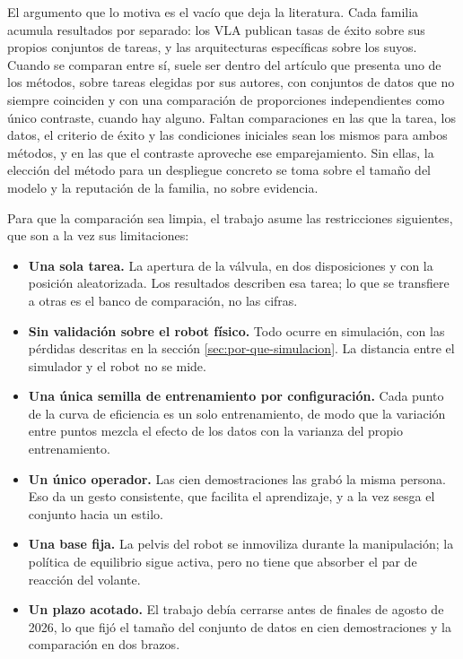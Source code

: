 El argumento que lo motiva es el vacío que deja la literatura. Cada familia acumula resultados por
separado: los VLA publican tasas de éxito sobre sus propios conjuntos de tareas, y las arquitecturas
específicas sobre los suyos. Cuando se comparan entre sí, suele ser dentro del artículo que presenta
uno de los métodos, sobre tareas elegidas por sus autores, con conjuntos de datos que no siempre
coinciden y con una comparación de proporciones independientes como único contraste, cuando hay
alguno. Faltan comparaciones en las que la tarea, los datos, el criterio de éxito y las condiciones
iniciales sean los mismos para ambos métodos, y en las que el contraste aproveche ese
emparejamiento. Sin ellas, la elección del método para un despliegue concreto se toma sobre el
tamaño del modelo y la reputación de la familia, no sobre evidencia.

Para que la comparación sea limpia, el trabajo asume las restricciones siguientes, que son a la vez
sus limitaciones:

\begin{itemize}

	\item \textbf{Una sola tarea.} La apertura de la válvula, en dos disposiciones y con la posición
	aleatorizada. Los resultados describen esa tarea; lo que se transfiere a otras es el banco de
	comparación, no las cifras.

	\item \textbf{Sin validación sobre el robot físico.} Todo ocurre en simulación, con las pérdidas descritas en la
	sección \ref{sec:por-que-simulacion}. La distancia entre el simulador y el robot no se mide.

	\item \textbf{Una única semilla de entrenamiento por configuración.} Cada punto de la curva de
	eficiencia es un solo entrenamiento, de modo que la variación entre puntos mezcla el efecto de
	los datos con la varianza del propio entrenamiento.

	\item \textbf{Un único operador.} Las cien demostraciones las grabó la misma persona. Eso da un
	gesto consistente, que facilita el aprendizaje, y a la vez sesga el conjunto hacia un estilo.

	\item \textbf{Una base fija.} La pelvis del robot se inmoviliza durante la manipulación; la
	política de equilibrio sigue activa, pero no tiene que absorber el par de reacción del volante.

	\item \textbf{Un plazo acotado.} El trabajo debía cerrarse antes de finales de agosto de 2026, lo
	que fijó el tamaño del conjunto de datos en cien demostraciones y la comparación en dos brazos.

\end{itemize}

